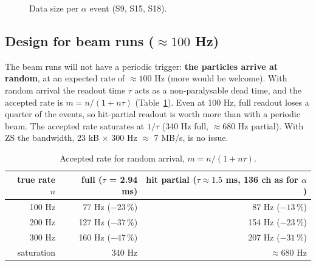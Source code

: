 \documentclass[a4paper,11pt]{article}
\begin{document}
\begin{figure}[h]\centering
{}
\caption{Data size per $\alpha$ event (S9, S15, S18).}
\end{figure}

\subsection{Design for beam runs ($\approx 100$ Hz)}\label{sec:beam}
The beam runs will not have a periodic trigger: \textbf{the particles arrive at random}, at an expected rate of $\approx 100$ Hz (more would be welcome). With random arrival the readout time $\tau$ acts as a non-paralysable dead time, and the accepted rate is $m = n/(1 + n\tau)$ (Table~\ref{tab:deadtime}).
Even at 100 Hz, full readout loses a quarter of the events, so hit-partial readout is worth more than with a periodic beam. The accepted rate saturates at $1/\tau$ (340 Hz full, $\approx 680$ Hz partial). With ZS the bandwidth, 23 kB $\times$ 300 Hz $\approx$ 7 MB/s, is no issue.

\begin{table}[h]\centering\small
\caption{Accepted rate for random arrival, $m = n/(1+n\tau)$.}
\label{tab:deadtime}
\begin{tabular}{rrr}
\toprule
true rate $n$ & full ($\tau$ = 2.94 ms) & hit partial ($\tau \approx 1.5$ ms, 136 ch as for $\alpha$) \\
\midrule
100 Hz & 77 Hz ($-23$\,\%) & 87 Hz ($-13$\,\%) \\
200 Hz & 127 Hz ($-37$\,\%) & 154 Hz ($-23$\,\%) \\
300 Hz & 160 Hz ($-47$\,\%) & 207 Hz ($-31$\,\%) \\
saturation & 340 Hz & $\approx 680$ Hz \\
\bottomrule
\end{tabular}
\end{table}
\end{document}
